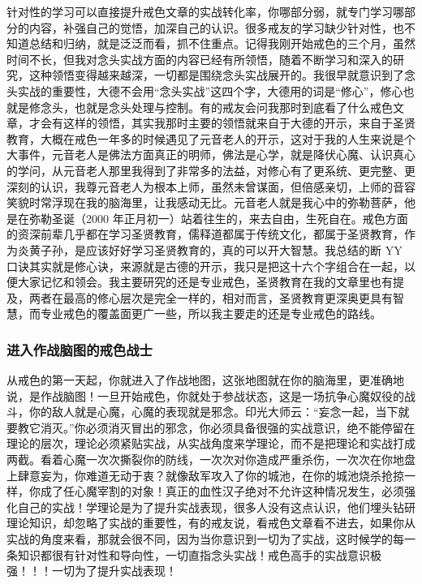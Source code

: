 针对性的学习可以直接提升戒色文章的实战转化率，你哪部分弱，就专门学习哪部分的内容，补强自己的觉悟，加深自己的认识。很多戒友的学习缺少针对性，也不知道总结和归纳，就是泛泛而看，抓不住重点。记得我刚开始戒色的三个月，虽然时间不长，但我对念头实战方面的内容已经有所领悟，随着不断学习和深入的研究，这种领悟变得越来越深，一切都是围绕念头实战展开的。我很早就意识到了念头实战的重要性，大德不会用“念头实战”这四个字，大德用的词是“修心”，修心也就是修念头，也就是念头处理与控制。有的戒友会问我那时到底看了什么戒色文章，才会有这样的领悟，其实我那时主要的领悟就来自于大德的开示，来自于圣贤教育，大概在戒色一年多的时候遇见了元音老人的开示，这对于我的人生来说是个大事件，元音老人是佛法方面真正的明师，佛法是心学，就是降伏心魔、认识真心的学问，从元音老人那里我得到了非常多的法益，对修心有了更系统、更完整、更深刻的认识，我尊元音老人为根本上师，虽然未曾谋面，但倍感亲切，上师的音容笑貌时常浮现在我的脑海里，让我感动无比。元音老人就是我心中的弥勒菩萨，他是在弥勒圣诞（2000 年正月初一）站着往生的，来去自由，生死自在。戒色方面的资深前辈几乎都在学习圣贤教育，儒释道都属于传统文化，都属于圣贤教育，作为炎黄子孙，是应该好好学习圣贤教育的，真的可以开大智慧。我总结的断 YY 口诀其实就是修心诀，来源就是古德的开示，我只是把这十六个字组合在一起，以便大家记忆和领会。我主要研究的还是专业戒色，圣贤教育在我的文章里也有提及，两者在最高的修心层次是完全一样的，相对而言，圣贤教育更深奥更具有智慧，而专业戒色的覆盖面更广一些，所以我主要走的还是专业戒色的路线。

\subsubsection{进入作战脑图的戒色战士}

从戒色的第一天起，你就进入了作战地图，这张地图就在你的脑海里，更准确地说，是作战脑图！一旦开始戒色，你就处于参战状态，这是一场抗争心魔奴役的战斗，你的敌人就是心魔，心魔的表现就是邪念。印光大师云：“妄念一起，当下就要教它消灭。”你必须消灭冒出的邪念，你必须具备很强的实战意识，绝不能停留在理论的层次，理论必须紧贴实战，从实战角度来学理论，而不是把理论和实战打成两截。看着心魔一次次撕裂你的防线，一次次对你造成严重杀伤，一次次在你地盘上肆意妄为，你难道无动于衷？就像敌军攻入了你的城池，在你的城池烧杀抢掠一样，你成了任心魔宰割的对象！真正的血性汉子绝对不允许这种情况发生，必须强化自己的实战！学理论是为了提升实战表现，很多人没有这点认识，他们埋头钻研理论知识，却忽略了实战的重要性，有的戒友说，看戒色文章看不进去，如果你从实战的角度来看，那就会很不同，因为当你意识到一切为了实战，这时候学的每一条知识都很有针对性和导向性，一切直指念头实战！戒色高手的实战意识极强！！！一切为了提升实战表现！

